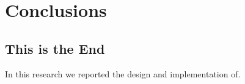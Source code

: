 \documentclass[12pt,a4paper,oneside]{book}
\begin{document}




\chapter{Conclusions}
\label{ch:Conclusions}

\section{This is the End}
\label{sec:This_is_the_end}
%
In this research we reported the design and implementation of.


\end{document}
